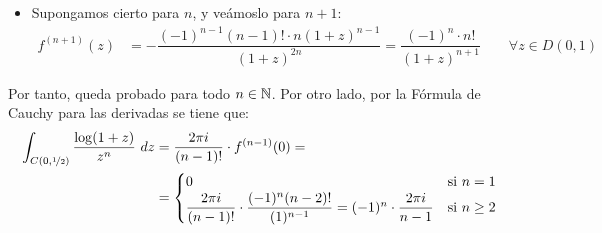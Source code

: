 \begin{ejercicio}
\begin{enumerate}
\begin{itemize}
            \item Supongamos cierto para $n$, y veámoslo para $n+1$:
            \begin{align*}
                f^{(n+1)}(z) &= -\dfrac{(-1)^{n-1}(n-1)!\cdot n(1+z)^{n-1}}{(1+z)^{2n}} = \dfrac{(-1)^{n}\cdot n!}{(1+z)^{n+1}} \qquad \forall z\in D(0,1)
            \end{align*}
        \end{itemize}

        Por tanto, queda probado para todo $n\in \mathbb{N}$.        
        Por otro lado, por la Fórmula de Cauchy para las derivadas se tiene que:
        \begin{align*}
            \int_{C(0,\nicefrac{1}{2})} \frac{\log(1+z)}{z^n}\ dz &= \dfrac{2\pi i}{(n-1)!}\cdot f^{(n-1)}(0) =\\&= \begin{cases}
                0 & \text{si } n=1\\
                \dfrac{2\pi i}{(n-1)!}\cdot \dfrac{(-1)^{n}(n-2)!}{(1)^{n-1}} = (-1)^n\cdot \dfrac{2\pi i}{n-1}& \text{si } n\geq 2
            \end{cases}
        \end{align*}
    \end{enumerate}
\end{ejercicio}

